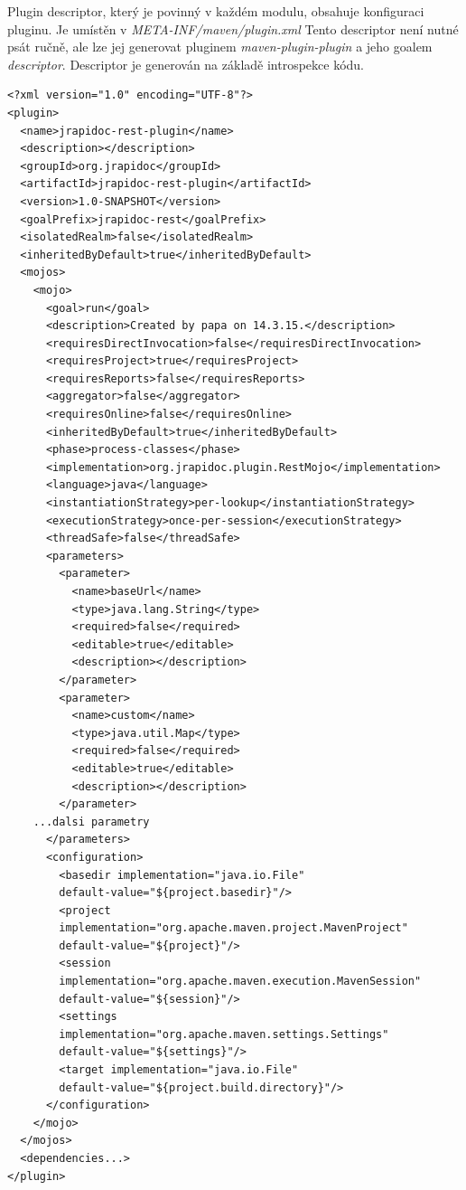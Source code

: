 \documentclass[11pt,twoside,a4paper]{book}
\begin{document}
Plugin descriptor, který je povinný v každém modulu, obsahuje konfiguraci pluginu. Je
umístěn v {\em META-INF/maven/plugin.xml} Tento descriptor není nutné psát
ručně, ale lze jej generovat pluginem {\em maven-plugin-plugin} a jeho goalem
{\em descriptor}. Descriptor je generován na základě introspekce kódu.

\begin{lstlisting}[frame=single,caption={Ukázka plugin descriptoru}]
<?xml version="1.0" encoding="UTF-8"?>
<plugin>
  <name>jrapidoc-rest-plugin</name>
  <description></description>
  <groupId>org.jrapidoc</groupId>
  <artifactId>jrapidoc-rest-plugin</artifactId>
  <version>1.0-SNAPSHOT</version>
  <goalPrefix>jrapidoc-rest</goalPrefix>
  <isolatedRealm>false</isolatedRealm>
  <inheritedByDefault>true</inheritedByDefault>
  <mojos>
    <mojo>
      <goal>run</goal>
      <description>Created by papa on 14.3.15.</description>
      <requiresDirectInvocation>false</requiresDirectInvocation>
      <requiresProject>true</requiresProject>
      <requiresReports>false</requiresReports>
      <aggregator>false</aggregator>
      <requiresOnline>false</requiresOnline>
      <inheritedByDefault>true</inheritedByDefault>
      <phase>process-classes</phase>
      <implementation>org.jrapidoc.plugin.RestMojo</implementation>
      <language>java</language>
      <instantiationStrategy>per-lookup</instantiationStrategy>
      <executionStrategy>once-per-session</executionStrategy>
      <threadSafe>false</threadSafe>
      <parameters>
        <parameter>
          <name>baseUrl</name>
          <type>java.lang.String</type>
          <required>false</required>
          <editable>true</editable>
          <description></description>
        </parameter>
        <parameter>
          <name>custom</name>
          <type>java.util.Map</type>
          <required>false</required>
          <editable>true</editable>
          <description></description>
        </parameter>
    ...dalsi parametry
      </parameters>
      <configuration>
        <basedir implementation="java.io.File" 
        default-value="${project.basedir}"/>
        <project 
        implementation="org.apache.maven.project.MavenProject" 
        default-value="${project}"/>
        <session 
        implementation="org.apache.maven.execution.MavenSession" 
        default-value="${session}"/>
        <settings 
        implementation="org.apache.maven.settings.Settings" 
        default-value="${settings}"/>
        <target implementation="java.io.File" 
        default-value="${project.build.directory}"/>
      </configuration>
    </mojo>
  </mojos>
  <dependencies...>
</plugin>
\end{lstlisting}
\end{document}
